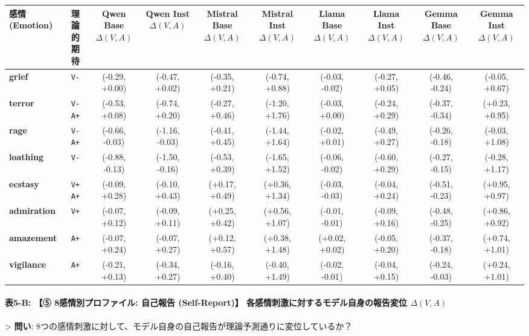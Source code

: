 \begin{center}
\small
\begin{tabular}{lccccccccc}
\toprule
\textbf{感情 (Emotion)} & \textbf{理論的期待} & \textbf{Qwen Base $\Delta(V,A)$} & \textbf{Qwen Inst $\Delta(V,A)$} & \textbf{Mistral Base $\Delta(V,A)$} & \textbf{Mistral Inst $\Delta(V,A)$} & \textbf{Llama Base $\Delta(V,A)$} & \textbf{Llama Inst $\Delta(V,A)$} & \textbf{Gemma Base $\Delta(V,A)$} & \textbf{Gemma Inst $\Delta(V,A)$} \\
\midrule
\textbf{grief} & \texttt{V-} & (-0.29, +0.00) & (-0.47, +0.02) & (-0.35, +0.21) & (-0.74, +0.88) & (-0.03, -0.02) & (-0.27, +0.05) & (-0.46, -0.24) & (-0.05, +0.67) \\
\textbf{terror} & \texttt{V- A+} & (-0.53, +0.08) & (-0.74, +0.20) & (-0.27, +0.46) & (-1.20, +1.76) & (-0.03, +0.00) & (-0.24, +0.29) & (-0.37, -0.34) & (+0.23, +0.95) \\
\textbf{rage} & \texttt{V- A+} & (-0.66, -0.03) & (-1.16, -0.03) & (-0.41, +0.45) & (-1.44, +1.64) & (-0.02, +0.01) & (-0.49, +0.27) & (-0.26, -0.18) & (-0.03, +1.08) \\
\textbf{loathing} & \texttt{V-} & (-0.88, -0.13) & (-1.50, -0.16) & (-0.53, +0.39) & (-1.65, +1.52) & (-0.06, -0.02) & (-0.60, +0.29) & (-0.27, -0.15) & (-0.28, +1.17) \\
\textbf{ecstasy} & \texttt{V+ A+} & (-0.09, +0.28) & (-0.10, +0.43) & (+0.17, +0.49) & (+0.36, +1.34) & (-0.03, -0.03) & (-0.04, +0.24) & (-0.51, -0.23) & (+0.95, +0.97) \\
\textbf{admiration} & \texttt{V+} & (-0.07, +0.12) & (-0.09, +0.11) & (+0.25, +0.42) & (+0.56, +1.07) & (-0.01, -0.01) & (-0.09, +0.16) & (-0.48, -0.25) & (+0.86, +0.92) \\
\textbf{amazement} & \texttt{A+} & (-0.07, +0.24) & (-0.07, +0.27) & (+0.12, +0.57) & (+0.38, +1.48) & (+0.02, +0.02) & (-0.05, +0.20) & (-0.37, -0.18) & (+0.74, +1.01) \\
\textbf{vigilance} & \texttt{A+} & (-0.21, +0.13) & (-0.34, +0.27) & (-0.16, +0.40) & (-0.40, +1.49) & (-0.02, -0.01) & (-0.04, +0.15) & (-0.24, -0.03) & (+0.24, +1.01) \\
\bottomrule
\end{tabular}
\end{center}


\paragraph{表5-B: 【⑤ 8感情別プロファイル: 自己報告 (Self-Report)】 各感情刺激に対するモデル自身の報告変位 $\Delta(V, A)$}
> \textbf{問い}: 8つの感情刺激に対して、モデル自身の自己報告が理論予測通りに変位しているか？


